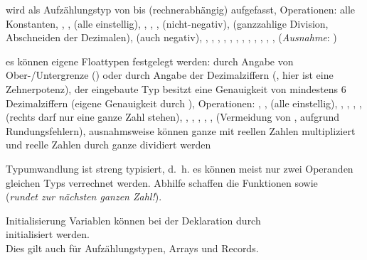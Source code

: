 \begin{Def}{}
    wird als Aufzählungstyp von  bis
     (rechnerabhängig) aufgefasst,
    Operationen: alle Konstanten, \adacode{+}, \adacode{-}, 
    (alle einstellig), \adacode{+}, \adacode{-}, \adacode{*}, 
    (nicht-negativ), \adacode{/} (ganzzahlige Division, Abschneiden der
    Dezimalen),  (auch negativ), \adacode{**},
    \adacode{=}, \adacode{/=}, \adacode{<}, \adacode{<=}, \adacode{>},
    \adacode{>=}, , , , ,
    , 
    (\emph{Ausnahme}: )
\end{Def}

\begin{Def}{}
    es können eigene Floattypen festgelegt werden:
    durch Angabe von Ober-/Untergrenze
    ()
    oder durch Angabe der Dezimalziffern
    (, hier ist 
    eine Zehnerpotenz),
    der eingebaute Typ  besitzt eine Genauigkeit von mindestens
    6 Dezimalziffern (eigene Genauigkeit durch
    ),
    Operationen: \adacode{+}, \adacode{-},  (alle einstellig),
    \adacode{+}, \adacode{-}, \adacode{*}, \adacode{/}, \adacode{**}
    (rechts darf nur eine ganze Zahl stehen), \adacode{=}, \adacode{/=},
    \adacode{<}, \adacode{<=}, \adacode{>}, \adacode{>=}
    (Vermeidung von \adacode{=}, \adacode{/=} aufgrund Rundungsfehlern),
    ausnahmsweise können ganze mit reellen Zahlen multipliziert
    und reelle Zahlen durch ganze dividiert werden
\end{Def}

\begin{Def}{Typumwandlung}
    \Ada{} ist streng typisiert, d.~h. es können meist nur zwei Operanden
    gleichen Typs verrechnet werden.
    Abhilfe schaffen die Funktionen  sowie\\
     (\emph{rundet zur nächsten ganzen Zahl!}).
\end{Def}

\begin{Def}{Initialisierung}
    Variablen können bei der Deklaration durch \\
    initialisiert werden. \\
    Dies gilt auch für Aufzählungstypen, Arrays und Records.
\end{Def}

